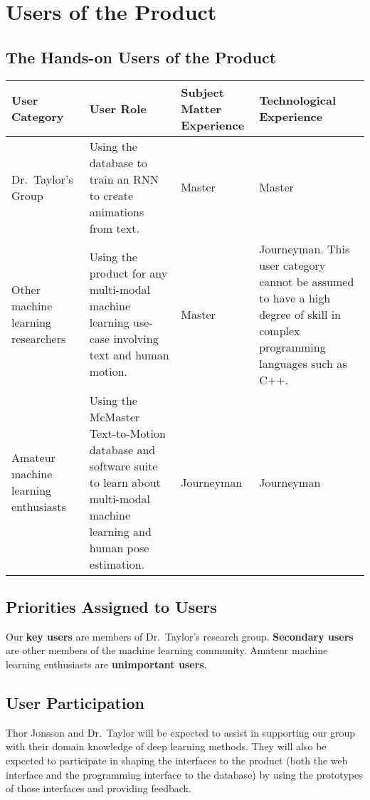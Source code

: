 \documentclass{scrreprt}
\begin{document}
\section{Users of the Product}

\subsection{The Hands-on Users of the Product}

\begin{center}
    \begin{tabular}{ | p{2cm} | p{4cm} | p{2cm} | p{4cm} |}
    \hline
    User Category & User Role & Subject Matter Experience &
    Technological Experience \\ \hline
    Dr.\ Taylor's Group & Using the database to train an RNN to create
            animations from text. & Master & Master \\
    Other machine learning researchers & Using the product for any multi-modal
            machine learning use-case involving text and human motion. & Master
            & Journeyman. This user category cannot be assumed to have a high
            degree of skill in complex programming languages such as C++. \\
    Amateur machine learning enthusiasts & Using the McMaster Text-to-Motion
            database and software suite to learn about multi-modal machine
            learning and human pose estimation. & Journeyman & Journeyman \\
    \hline
    \end{tabular}
\end{center}

\subsection{Priorities Assigned to Users}

Our \textbf{key users} are members of Dr.\ Taylor's research group.
\textbf{Secondary users} are other members of the machine learning community.
Amateur machine learning enthusiasts are \textbf{unimportant users}.

\subsection{User Participation}

Thor Jonsson and Dr.\ Taylor will be expected to assist in supporting our group
with their domain knowledge of deep learning methods. They will also be
expected to participate in shaping the interfaces to the product (both the web
interface and the programming interface to the database) by using the
prototypes of those interfaces and providing feedback.
\end{document}
